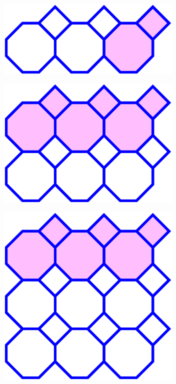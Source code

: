 \documentclass{beamer}
\begin{document}
\begin{frame}
  \begin{center}
    \includegraphics[width=3.5in]{periodic3}
  \end{center}
\end{frame}

\begin{frame}
  \begin{center}
    \includegraphics[width=3.5in]{periodic4}
  \end{center}
\end{frame}

\begin{frame}
  \begin{center}
    \includegraphics[width=3.5in]{periodic5}
  \end{center}
\end{frame}
\end{document}
